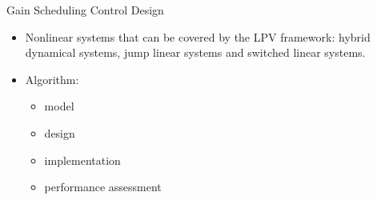 \begin{frame}{Gain Scheduling Control Design}
    \begin{itemize}
        \item Nonlinear systems that can be covered by the LPV framework: hybrid dynamical systems, jump linear systems and switched linear systems. \autocite{Hoffmann2015}
        
        \item Algorithm:
        \begin{itemize}
            \item model
            \item design
            \item implementation
            \item performance assessment
        \end{itemize}
        
    \end{itemize}
\end{frame}


